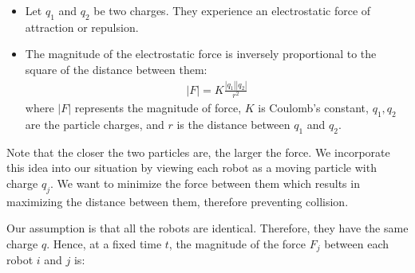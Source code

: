 \begin{itemize}
    \item Let \( q_1 \) and \( q_2 \) be two charges. They experience an electrostatic force of attraction or repulsion.
\begin{center}
    
\end{center}

\begin{center}
    
\end{center}
 \item The magnitude of the electrostatic force is inversely proportional to the square of the distance between them:
    \begin{align*}
        |F| = K\frac{|q_1||q_2|}{r^2}
    \end{align*}
    where \( |F| \) represents the magnitude of force, \( K \) is Coulomb's constant, \( q_1,q_2 \)  are the particle charges, and \( r \) is the distance between \( q_1 \) and \( q_2 \).  
\end{itemize}

Note that the closer the two particles are, the larger the force. We incorporate this idea into our situation by viewing each robot as a moving particle with charge \( q_j \). We want to minimize the force between them which results in maximizing the distance between them, therefore preventing collision.

Our assumption is that all the robots are identical. Therefore, they have the same charge \( q \). Hence, at a fixed time \( t \), the magnitude of the force \( F_j \) between each robot \( i \) and \(j \) is:

